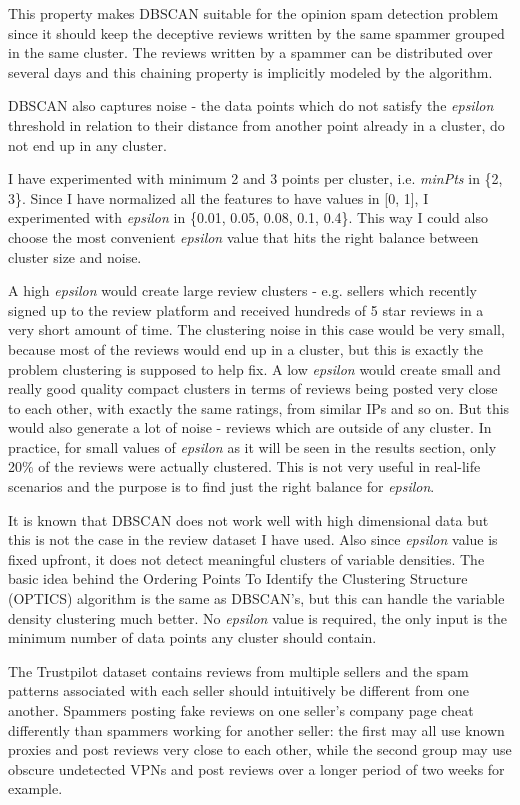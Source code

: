 This property makes DBSCAN suitable for the opinion spam detection problem since it should keep the deceptive reviews written by the same spammer grouped in the same cluster. The reviews written by a spammer can be distributed over several days and this chaining property is implicitly modeled by the algorithm. 

DBSCAN also captures noise - the data points which do not satisfy the \textit{epsilon} threshold in relation to their distance from another point already in a cluster, do not end up in any cluster.

I have experimented with minimum 2 and 3 points per cluster, i.e. \textit{minPts} in \{2, 3\}. 
Since I have normalized all the features to have values in [0, 1], I experimented with \textit{epsilon} in \{0.01, 0.05, 0.08, 0.1, 0.4\}. This way I could also choose the most convenient \textit{epsilon} value that hits the right balance between cluster size and noise. 

A high \textit{epsilon} would create large review clusters - e.g. sellers which recently signed up to the review platform and received hundreds of 5 star reviews in a very short amount of time. The clustering noise in this case would be very small, because most of the reviews would end up in a cluster, but this is exactly the problem clustering is supposed to help fix. A low \textit{epsilon} would create small and really good quality compact clusters in terms of reviews being posted very close to each other, with exactly the same ratings, from similar IPs and so on. But this would also generate a lot of noise - reviews which are outside of any cluster. In practice, for small values of \textit{epsilon} as it will be seen in the results section, only 20\% of the reviews were actually clustered. This is not very useful in real-life scenarios and the purpose is to find just the right balance for \textit{epsilon}.

It is known that DBSCAN does not work well with high dimensional data but this is not the case in the review dataset I have used. Also since \textit{epsilon} value is fixed upfront, it does not detect meaningful clusters of variable densities. The basic idea behind the Ordering Points To Identify the Clustering Structure (OPTICS) algorithm is the same as DBSCAN’s, but this can handle the variable density clustering much better. No \textit{epsilon} value is required, the only input is the minimum number of data points any cluster should contain. 

The Trustpilot dataset contains reviews from multiple sellers and the spam patterns associated with each seller should intuitively be different from one another. Spammers posting fake reviews on one seller’s company page cheat differently than spammers working for another seller: the first may all use known proxies and post reviews very close to each other, while the second group may use obscure undetected VPNs and post reviews over a longer period of two weeks for example.

